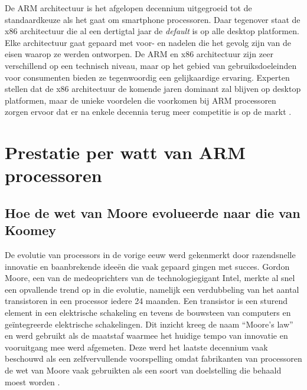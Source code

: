 De ARM architectuur is het afgelopen decennium uitgegroeid tot de standaardkeuze als het gaat om smartphone processoren. Daar tegenover staat de x86 architectuur die al een dertigtal jaar de \textit{default} is op alle desktop platformen. Elke architectuur gaat gepaard met voor- en nadelen die het gevolg zijn van de eisen waarop ze werden ontworpen. De ARM en x86 architectuur zijn zeer verschillend op een technisch niveau, maar op het gebied van gebruiksdoeleinden voor consumenten bieden ze tegenwoordig een gelijkaardige ervaring. Experten stellen dat de x86 architectuur de komende jaren dominant zal blijven op desktop platformen, maar de unieke voordelen die voorkomen bij ARM processoren zorgen ervoor dat er na enkele decennia terug meer competitie is op de markt \autocite{Triggs2022}.

\section{Prestatie per watt van ARM processoren}
\subsection{Hoe de wet van Moore evolueerde naar die van Koomey}
De evolutie van processors in de vorige eeuw werd gekenmerkt door razendsnelle innovatie en baanbrekende ideeën die vaak gepaard gingen met succes. Gordon Moore, een van de medeoprichters van de technologiegigant Intel, merkte al snel een opvallende trend op in die evolutie, namelijk een verdubbeling van het aantal transistoren in een processor iedere 24 maanden. Een transistor is een sturend element in een elektrische schakeling en tevens de bouwsteen van computers en geïntegreerde elektrische schakelingen. Dit inzicht kreeg de naam “Moore’s law” en werd gebruikt als de maatstaf waarmee het huidige tempo van innovatie en vooruitgang mee werd afgemeten. Deze werd het laatste decennium vaak beschouwd als een zelfvervullende voorspelling omdat fabrikanten van processoren de wet van Moore vaak gebruikten als een soort van doelstelling die behaald moest worden \autocite{Schaller1997}.

